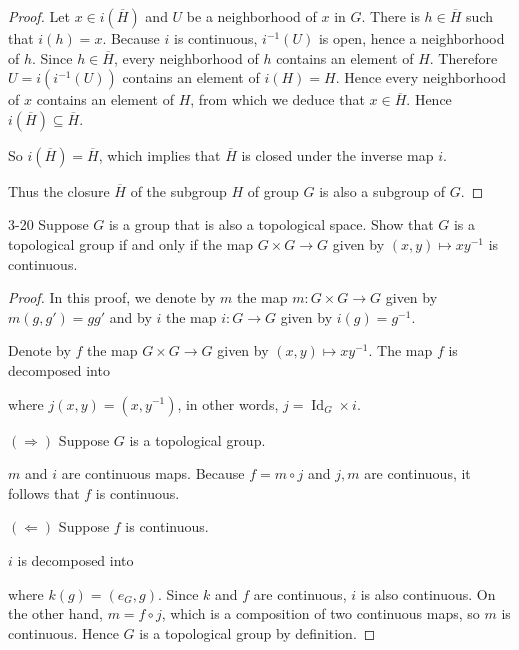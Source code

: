 \begin{proof}
    Let $x \in i(\overline{H})$ and $U$ be a neighborhood of $x$ in $G$. There is $h\in \overline{H}$ such that $i(h) = x$. Because $i$ is continuous, $i^{-1}(U)$ is open, hence a neighborhood of $h$. Since $h\in \overline{H}$, every neighborhood of $h$ contains an element of $H$. Therefore $U = i(i^{-1}(U))$ contains an element of $i(H) = H$. Hence every neighborhood of $x$ contains an element of $H$, from which we deduce that $x \in \overline{H}$. Hence $i(\overline{H}) \subseteq \overline{H}$.

    So $i(\overline{H}) = \overline{H}$, which implies that $\overline{H}$ is closed under the inverse map $i$.

    Thus the closure $\overline{H}$ of the subgroup $H$ of group $G$ is also a subgroup of $G$.
\end{proof}

\begin{problem}{3-20}
Suppose $G$ is a group that is also a topological space. Show that $G$ is a topological group if and only if the map $G\times G\to G$ given by $(x, y) \mapsto xy^{-1}$ is continuous.
\end{problem}

\begin{proof}
    In this proof, we denote by $m$ the map $m: G\times G\to G$ given by $m(g, g') = gg'$ and by $i$ the map $i: G\to G$ given by $i(g) = g^{-1}$.

    Denote by $f$ the map $G\times G\to G$ given by $(x, y) \mapsto xy^{-1}$. The map $f$ is decomposed into
    \begin{center}
    \end{center}

    where $j(x, y) = (x, y^{-1})$, in other words, $j = \operatorname{Id}_{G} \times i$.

    $(\Longrightarrow)$ Suppose $G$ is a topological group.

    $m$ and $i$ are continuous maps. Because $f = m\circ j$ and $j, m$ are continuous, it follows that $f$ is continuous.

    $(\Longleftarrow)$ Suppose $f$ is continuous.

    $i$ is decomposed into
    \begin{center}
    \end{center}

    where $k(g) = (e_{G}, g)$. Since $k$ and $f$ are continuous, $i$ is also continuous. On the other hand, $m = f \circ j$, which is a composition of two continuous maps, so $m$ is continuous. Hence $G$ is a topological group by definition.
\end{proof}

